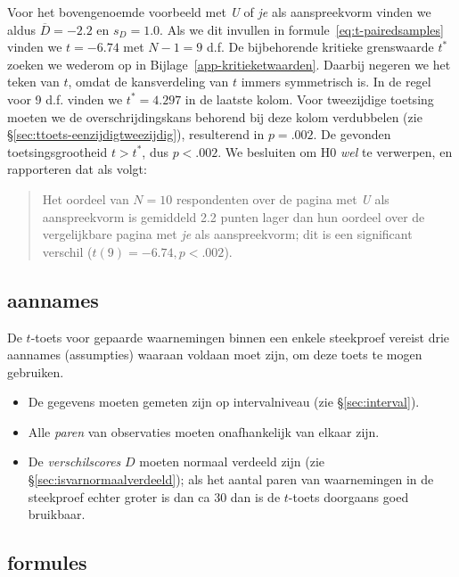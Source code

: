 \documentclass[
]{book}
\begin{document}
Voor het bovengenoemde voorbeeld met \emph{U} of \emph{je} als aanspreekvorm
vinden we aldus \(\overline{D}=-2.2\) en \(s_D=1.0\). Als we dit invullen in
formule~\eqref{eq:t-pairedsamples} vinden we \(t=-6.74\) met \(N-1=9\) d.f.
De bijbehorende kritieke grenswaarde \(t^*\) zoeken we wederom op in
Bijlage~\ref{app-kritieketwaarden}. Daarbij negeren we het teken van
\(t\), omdat de kansverdeling van \(t\) immers symmetrisch is. In de regel
voor 9 d.f. vinden we \(t^*=4.297\) in de laatste kolom. Voor tweezijdige
toetsing moeten we de overschrijdingskans behorend bij deze kolom
verdubbelen (zie §\ref{sec:ttoets-eenzijdigtweezijdig}), resulterend in
\(p=.002\). De gevonden toetsingsgrootheid \(t > t^*\), dus \(p<.002\). We
besluiten om H0 \emph{wel} te verwerpen, en rapporteren dat als volgt:

\begin{quote}
Het oordeel van \(N=10\) respondenten over de pagina met \emph{U} als
aanspreekvorm is gemiddeld 2.2 punten lager dan hun oordeel over de
vergelijkbare pagina met \emph{je} als aanspreekvorm; dit is een
significant verschil (\(t(9)=-6.74, p<.002\)).
\end{quote}

\subsection{aannames}\label{aannames-1}

De \(t\)-toets voor gepaarde waarnemingen binnen een enkele steekproef
vereist drie aannames (assumpties) waaraan voldaan moet zijn, om deze
toets te mogen gebruiken.

\begin{itemize}
\item
  De gegevens moeten gemeten zijn op intervalniveau (zie
  §\ref{sec:interval}).
\item
  Alle \emph{paren} van observaties moeten onafhankelijk van elkaar zijn.
\item
  De \emph{verschilscores} \(D\) moeten normaal verdeeld zijn (zie
  §\ref{sec:isvarnormaalverdeeld}); als het aantal paren van
  waarnemingen in de steekproef echter groter is dan ca 30 dan is de
  \(t\)-toets doorgaans goed bruikbaar.
\end{itemize}

\subsection{formules}\label{sec:formules13-4}
\end{document}
